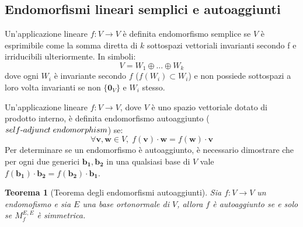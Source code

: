 \documentclass{article}
\newtheorem{theorem}{Teorema}
\begin{document}
\vspace{10pt}
\subsection{Endomorfismi lineari semplici e autoaggiunti}
    Un'applicazione lineare $f : V \rightarrow V$ è definita endomorfismo semplice se $V$ è esprimibile come la somma diretta di $k$ sottospazi vettoriali invarianti secondo f e irriducibili ulteriormente. In simboli:
    \[
        V = W_1 \oplus ... \oplus W_k 
    \]
    dove ogni $W_i$ è invariante secondo $f$ ($f(W_i) \subset W_i$) e non possiede sottospazi a loro volta invarianti se non $\{\mathbf{0}_V\}$ e $W_i$ stesso.

    \vspace{10pt}
    Un'applicazione lineare $f: V \rightarrow V$, dove $V$ è uno spazio vettoriale dotato di prodotto interno, è definita endomorfismo autoaggiunto ($self \textnormal{-} adjunct \; endomorphism$) se:
    \[
        \forall \mathbf{v}, \mathbf{w} \in V, \; f(\mathbf{v}) \cdot \mathbf{w} = f(\mathbf{w}) \cdot \mathbf{v}  
    \]
    Per determinare se un endomorfismo è autoaggiunto, è necessario dimostrare che per ogni due generici $\mathbf{b_1}, \mathbf{b_2}$ in una qualsiasi base di $V$ vale
    $f(\mathbf{b_1}) \cdot \mathbf{b_2} = f(\mathbf{b_2}) \cdot \mathbf{b_1}$.

    \begin{theorem}[Teorema degli endomorfismi autoaggiunti]
        Sia $f: V \rightarrow V$ un endomofismo e sia $E$ una base ortonormale di $V$, allora $f$ è autoaggiunto se e solo se 
        $M_{f}^{E, E}$ è simmetrica.
    \end{theorem}
\end{document}
